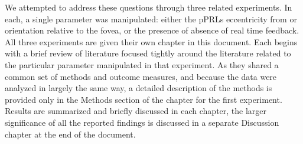 We attempted to address these questions through three related experiments. In each, a single parameter was manipulated: either the pPRLs eccentricity from or orientation relative to the fovea, or the presence of absence of real time feedback. All three experiments are given their own chapter in this document. Each begins with a brief review of literature focused tightly around the literature related to the particular parameter manipulated in that experiment. As they shared a common set of methods and outcome measures, and because the data were analyzed in largely the same way, a detailed description of the methods is provided only in the Methods section of the chapter for the first experiment. Results are summarized and briefly discussed in each chapter, the larger significance of all the reported findings is discussed in a separate Discussion chapter at the end of the document. 
